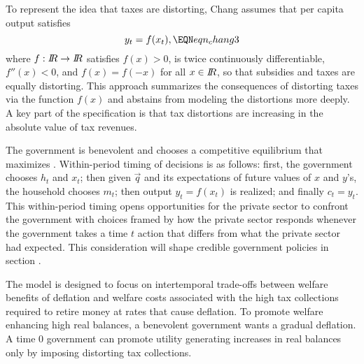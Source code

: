 To represent the idea that taxes are distorting, Chang assumes that per capita output satisfies
$$ y_t = f(x_t), \EQN eqn_chang3 $$
where $f: {{I\kern-0.3em R}}\rightarrow {{I\kern-0.3em R}}$ satisfies $f(x)  > 0$, is twice continuously differentiable,  $ f''(x) < 0$, and $ f(x) = f(-x)$ for all $x \in
{I\kern-0.3em R}$, so that subsidies and taxes are equally distorting. This approach  summarizes the   consequences of  distorting taxes
via the function $f(x)$ and abstains from modeling the  distortions more deeply. A key part of the specification is that tax distortions are increasing in the absolute value of tax revenues.

The government is benevolent and chooses a competitive equilibrium that maximizes .
Within-period timing of decisions is as follows: %
first, the government chooses $h_t$ and $x_t$; then given $\vec q$ and its expectations of future values of $x$ and $y$'s,
 the household chooses %
  $m_t$; %
then output $y_t = f(x_t)$ is realized;
and  finally $c_t = y_t$.
 This within-period timing opens  opportunities for the
private sector to confront the government with choices framed by  how the private sector responds  whenever the government takes a time $t$ action
that differs from what the private sector had expected. This consideration will shape  credible government policies in section .

The model is designed to focus on  intertemporal trade-offs between  welfare benefits of deflation and  welfare costs associated
with the high tax collections required to retire money at  rates that cause deflation. To promote  welfare enhancing high real balances, a benevolent government wants  a gradual deflation.
A time $0$ government
can promote utility generating  increases in real balances only by  imposing distorting tax collections.



